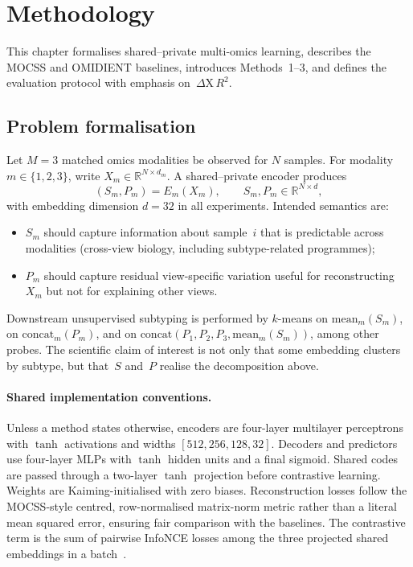 \clearpage
\section{Methodology}
\label{sec:methodology}

This chapter formalises shared--private multi-omics learning, describes the MOCSS and OMIDIENT baselines, introduces Methods~1--3, and defines the evaluation protocol with emphasis on~$\Delta\mathrm{X}\,R^{2}$.

\subsection{Problem formalisation}

Let $M=3$ matched omics modalities be observed for $N$ samples. For modality $m\in\{1,2,3\}$, write $X_m\in\mathbb{R}^{N\times d_m}$. A shared--private encoder produces
\begin{equation}
(S_m,P_m)=E_m(X_m),\qquad S_m,P_m\in\mathbb{R}^{N\times d},
\end{equation}
with embedding dimension $d=32$ in all experiments. Intended semantics are:
\begin{itemize}
\item $S_m$ should capture information about sample~$i$ that is predictable across modalities (cross-view biology, including subtype-related programmes);
\item $P_m$ should capture residual view-specific variation useful for reconstructing $X_m$ but not for explaining other views.
\end{itemize}
Downstream unsupervised subtyping is performed by $k$-means on $\mathrm{mean}_m(S_m)$, on $\mathrm{concat}_m(P_m)$, and on $\mathrm{concat}(P_1,P_2,P_3,\mathrm{mean}_m(S_m))$, among other probes. The scientific claim of interest is not only that some embedding clusters by subtype, but that~$S$ and~$P$ realise the decomposition above.

\paragraph{Shared implementation conventions.}
Unless a method states otherwise, encoders are four-layer multilayer perceptrons with $\tanh$ activations and widths $[512,256,128,32]$. Decoders and predictors use four-layer MLPs with $\tanh$ hidden units and a final sigmoid. Shared codes are passed through a two-layer $\tanh$ projection before contrastive learning. Weights are Kaiming-initialised with zero biases. Reconstruction losses follow the MOCSS-style centred, row-normalised matrix-norm metric rather than a literal mean squared error, ensuring fair comparison with the baselines. The contrastive term is the sum of pairwise InfoNCE losses among the three projected shared embeddings in a batch~\citep{chen2020simple,chen2023mocss}.

